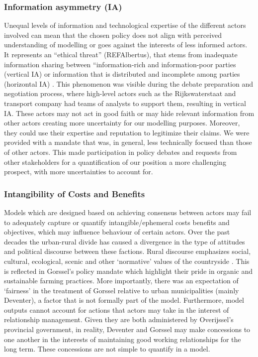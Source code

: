 \subsubsection{Information asymmetry (IA)}
Unequal levels of information and technological expertise of the different actors involved can mean that the chosen policy does not align with perceived understanding of modelling or goes against the interests of less informed actors. It represents an “ethical threat” (REFAlbertus), that stems from inadequate information sharing between “information-rich and information-poor parties (vertical IA) or information that is distributed and incomplete among parties (horizontal IA) \parencite{clarkson_information_2007}. This phenomenon was visible during the debate preparation and negotiation process, where high-level actors such as the Rijkswaterstaat and transport company had teams of analysts to support them, resulting in vertical IA. These actors may not act in good faith or may hide relevant information from other actors creating more uncertainty for our modelling purposes. Moreover, they could use their expertise and reputation to legitimize their claims. We were provided with a mandate that was, in general, less technically focused than those of other actors. This made participation in policy debates and requests from other stakeholders for a quantification of our position a more challenging prospect, with more uncertainties to account for. 

\subsubsection{Intangibility of Costs and Benefits}
Models which are designed based on achieving consensus between actors may fail to adequately capture or quantify intangible/ephemeral costs benefits and objectives, which may influence behaviour of certain actors. Over the past decades the urban-rural divide has caused a divergence in the type of attitudes and political discourse between these factions. Rural discourse emphasizes social, cultural, ecological, scenic and other ‘normative’ values of the countryside \parencite{frouws_contested_1998, andersson_beyond_2009}. This is reflected in Gorssel’s policy mandate which highlight their pride in organic and sustainable farming practices. More importantly, there was an expectation of ‘fairness’ in the treatment of Gorssel relative to urban municipalities (mainly Deventer), a factor that is not formally part of the model. Furthermore, model outputs cannot account for actions that actors may take in the interest of relationship management. Given they are both administered by Overijssel’s provincial government, in reality, Deventer and Gorssel may make concessions to one another in the interests of maintaining good working relationships for the long term. These concessions are not simple to quantify in a model. 

